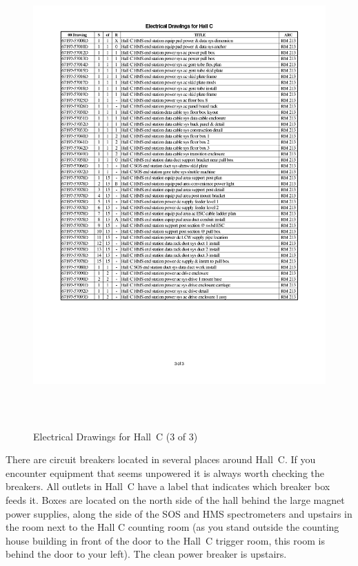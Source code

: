 {\clearpage
\begin{figure}
\begin{center}
\includegraphics[height=7in]{ele3p.pdf}
\caption{Electrical Drawings for Hall~C (3 of 3)}
\label{fig:elect_dwgs3}
\end{center}
\end{figure}
\clearpage


There are circuit breakers located in several places around Hall~C.
If you encounter equipment that seems unpowered it is always worth checking the
breakers. All outlets in Hall~C  have a label that indicates which
breaker box feeds it. Boxes are located on the north side of the hall behind
the large magnet power supplies, along the side of the SOS and HMS spectrometers
and upstairs in the room next to the Hall C counting room (as you stand outside the
counting house building in front of the door to the Hall~C trigger
room, this room is behind the door to your left). The clean power
breaker is upstairs.

}
